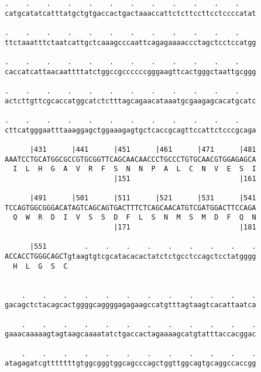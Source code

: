\documentclass{article}
\begin{document}
\begin{Verbatim}
.    .    .    .    .    .    .    .    .    .    .    .    
catgcatatcatttatgctgtgaccactgactaaaccattctcttccttcctccccatat
                                                            
.    .    .    .    .    .    .    .    .    .    .    .    
ttctaaatttctaatcattgctcaaagcccaattcagagaaaaccctagctcctccatgg
                                                            
.    .    .    .    .    .    .    .    .    .    .    .    
caccatcattaacaattttatctggccgccccccgggaagttcactgggctaattgcggg
                                                            
.    .    .    .    .    .    .    .    .    .    .    .    
actcttgttcgcaccatggcatctctttagcagaacataaatgcgaagagcacatgcatc
                                                            
.    .    .    .    .    .    .    .    .    .    .    .    
cttcatgggaatttaaaggagctggaaagagtgctcaccgcagttccattctcccgcaga
                                                            
      |431      |441      |451      |461      |471      |481
AAATCCTGCATGGCGCCGTGCGGTTCAGCAACAACCCTGCCCTGTGCAACGTGGAGAGCA
  I  L  H  G  A  V  R  F  S  N  N  P  A  L  C  N  V  E  S  I
                          |151                          |161
  
      |491      |501      |511      |521      |531      |541
TCCAGTGGCGGGACATAGTCAGCAGTGACTTTCTCAGCAACATGTCGATGGACTTCCAGA
  Q  W  R  D  I  V  S  S  D  F  L  S  N  M  S  M  D  F  Q  N
                          |171                          |181
  
      |551         .    .    .    .    .    .    .    .    .
ACCACCTGGGCAGCTgtaagtgtcgcatacacactatctctgcctccagctcctatgggg
  H  L  G  S  C                                             
                                                            
  
    .    .    .    .    .    .    .    .    .    .    .    .
gacagctctacagcactggggcaggggagagaagccatgtttagtaagtcacattaatca
                                                            
    .    .    .    .    .    .    .    .    .    .    .    .
gaaacaaaaagtagtaagcaaaatatctgaccactagaaaagcatgtatttaccacggac
                                                            
    .    .    .    .    .    .    .    .    .    .    .    .
atagagatcgtttttttgtggcgggtggcagcccagctggttggcagtgcaggccaccgg
                                                            

\end{Verbatim}
\end{document}
